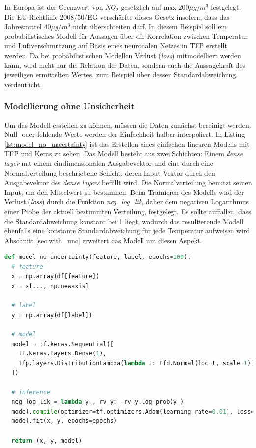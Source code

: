 \documentclass[12pt]{article}
\begin{document}
In Europa ist der Grenzwert von $NO_2$ gesetzlich auf max $200{\mu g/m^3}$ festgelegt. Die EU-Richtlinie 2008/50/EG verschärfte dieses Gesetz insofern, dass das Jahresmittel $40{\mu g/m^3}$ nicht überschreiten darf. In diesem Beispiel soll ein probabilistisches Modell für Aussagen über die Korrelation zwischen Temperatur und Luftverschmutzung auf Basis eines neuronalen Netzes in TFP erstellt werden. Da bei probabilistischen Modellen Verlust (\textit{loss}) mitmodelliert werden kann, wird nicht nur die Relation der Daten, sondern auch die Aussagekraft des jeweiligen ermittelten Wertes, zum Beispiel über dessen Standardabweichung, verdeutlicht.

\subsubsection{Modellierung ohne Unsicherheit}
\label{sec:no_unc}

Um das Modell erstellen zu können, müssen die Daten zunächst bereinigt werden. Null- oder fehlende Werte werden der Einfachheit halber interpoliert. In Listing \ref{lst:model_no_uncertainty} ist das Erstellen eines einfachen linearen Modells mit TFP und Keras zu sehen. Das Modell besteht aus zwei Schichten: Einem \textit{dense layer} mit einem eindimensionalen Ausgabevektor und eine durch eine Normalverteilung beschriebene Schicht, deren Input-Vektor durch den Ausgabevektor des \textit{dense layers} befüllt wird. Die Normalverteilung benutzt seinen Input, um den Mittelwert zu bestimmen. Beim Trainieren des Modells wird der Verlust (\textit{loss}) durch die Funktion \textit{neg\_log\_lik}, daher dem negativen Logarithmus einer Probe der aktuell bestimmten Verteilung, festgelegt. Es sollte auffallen, dass die Standardabweichung konstant bei 1 liegt, wodurch das resultierende Modell ebenfalls eine konstante Standardabweichung für jede Temperatur aufweisen wird. Abschnitt \ref{sec:with_unc} erweitert das Modell um diesen Aspekt.

\begin{lstlisting}[language=Python, caption={Modell mit Keras ohne Unsicherheit}, label={lst:model_no_uncertainty}]
def model_no_uncertainty(feature, label, epochs=100):
  # feature
  x = np.array(df[feature])
  x = x[..., np.newaxis]

  # label
  y = np.array(df[label])
  
  # model
  model = tf.keras.Sequential([
    tf.keras.layers.Dense(1),
    tfp.layers.DistributionLambda(lambda t: tfd.Normal(loc=t, scale=1)),
  ])

  # inference
  neg_log_lik = lambda y_, rv_y: -rv_y.log_prob(y_)
  model.compile(optimizer=tf.optimizers.Adam(learning_rate=0.01), loss=neg_log_lik)
  model.fit(x, y, epochs=epochs)
  
  return (x, y, model)
\end{lstlisting}
\end{document}
